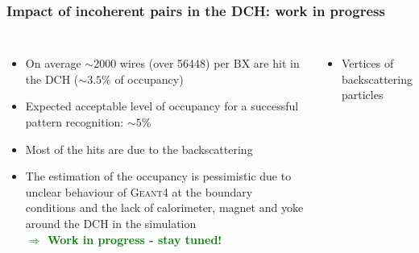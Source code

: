\documentclass[aspectratio=169, hyperref={colorlinks=true,pdfpagelabels=false,linkcolor=black}, xcolor=dvipsnames,10pt]{beamer}
\begin{document}
\begin{frame}
	\frametitle{Impact of incoherent pairs in the DCH: work in progress}

	\begin{columns}[t]
		\begin{itemize}
		\item On average $\sim2000$ wires (over 56448) per BX are hit in the DCH ($\sim3.5\%$ of occupancy) \vspace{0.2cm}
		\item Expected acceptable level of occupancy for a successful pattern recognition: $\sim5\%$ \vspace{0.2cm}
		\item Most of the hits are due to the backscattering   \vspace{0.2cm}
		\item The estimation of the occupancy is pessimistic due to unclear behaviour of \textsc{Geant4} at the boundary conditions and the lack of calorimeter, magnet and yoke around the DCH in the simulation \\
		\textbf{\textcolor{Green}{$\Rightarrow$ Work in progress - stay tuned!}}
		\end{itemize}	
	
	
	\begin{itemize}
	\item Vertices of backscattering particles
	\end{itemize}
	\centering

\end{columns}
\end{frame}
\end{document}
